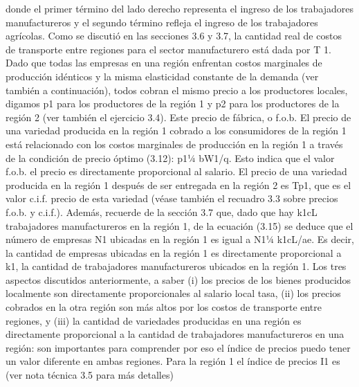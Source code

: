 donde el primer término del lado derecho representa el ingreso de los trabajadores manufactureros y el segundo término refleja el ingreso de los trabajadores agrícolas. Como se discutió en las secciones 3.6 y 3.7, la cantidad real de costos de transporte entre regiones para el sector manufacturero está dada por T 1. Dado que todas las empresas en una región enfrentan costos marginales de producción idénticos y la misma elasticidad constante de la demanda (ver también a continuación), todos cobran el mismo precio a los productores locales, digamos p1 para los productores de la región 1 y p2 para los productores de la región 2 (ver también el ejercicio 3.4). Este precio de fábrica, o f.o.b. El precio de una variedad producida en la región 1 cobrado a los consumidores de la región 1 está relacionado con los costos marginales de producción en la región 1 a través de la condición de precio óptimo (3.12): p1¼ bW1/q. Esto indica que el valor f.o.b. el precio es directamente proporcional al salario. El precio de una variedad producida en la región 1 después de ser entregada en la región 2 es Tp1, que es el valor c.i.f. precio de esta variedad (véase también el recuadro 3.3 sobre precios f.o.b. y c.i.f.). Además, recuerde de la sección 3.7 que, dado que hay k1cL trabajadores manufactureros en la región 1, de la ecuación (3.15) se deduce que el número de empresas N1 ubicadas en la región 1 es igual a N1¼ k1cL/ae. Es decir, la cantidad de empresas ubicadas en la región 1 es directamente proporcional a k1, la cantidad de trabajadores manufactureros ubicados en la región 1. Los tres aspectos discutidos anteriormente, a saber (i) los precios de los bienes producidos localmente son directamente proporcionales al salario local tasa, (ii) los precios cobrados en la otra región son más altos por los costos de transporte entre regiones, y (iii) la cantidad de variedades producidas en una región es directamente proporcional a la cantidad de trabajadores manufactureros en una región: son importantes para comprender por eso el índice de precios puedo tener un valor diferente en ambas regiones. Para la región 1 el índice de precios I1 es (ver nota técnica 3.5 para más detalles)



